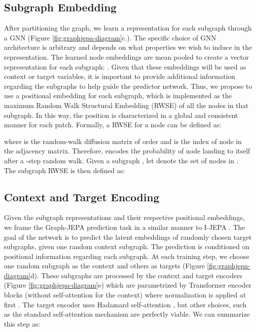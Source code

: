 \documentclass{article} \usepackage{iclr2024_conference,times}
\begin{document}
\subsection{Subgraph Embedding} \label{met:rwse}
After partitioning the graph, we learn a representation for each subgraph through a GNN (Figure \ref{fig:graphjepa-diagram}c.). The specific choice of GNN architecture is arbitrary and depends on what properties we wish to induce in the representation. The learned node embeddings are mean pooled to create a vector representation for each subgraph: . Given that these embeddings will be used as context or target variables, it is important to provide additional information regarding the subgraphs to help guide the predictor network. Thus, we propose to use a positional embedding for each subgraph, which is implemented as the maximum Random Walk Structural Embedding (RWSE) of all the nodes in that subgraph. In this way, the position is characterized in a global and consistent manner for each patch. Formally, a RWSE \citep{dwivedi2021graph} for a node  can be defined as:

where  is the random-walk diffusion matrix of order  and  is the index of node  in the adjacency matrix. Therefore,  encodes the probability of node  landing to itself after a -step random walk. Given a subgraph , let  denote the set of nodes in . The subgraph RWSE is then defined as:
 

\subsection{Context and Target Encoding} \label{met:context_target}
Given the subgraph representations and their respective positional embeddings, we frame the Graph-JEPA prediction task in a similar manner to I-JEPA \citep{assran2023self}. The goal of the network is to predict the latent embeddings of randomly chosen target subgraphs, given one random context subgraph. The prediction is conditioned on positional information regarding each subgraph. At each training step, we choose one random subgraph as the context  and  others as targets  (Figure \ref{fig:graphjepa-diagram}d). These subgraphs are processed by the context and target encoders (Figure \ref{fig:graphjepa-diagram}e) which are parametrized by Transformer encoder blocks (without self-attention for the context) where normalization is applied at first \citep{xiong2020layer}. The target encoder uses Hadamard self-attention \citep{he2023generalization}, but other choices, such as the standard self-attention mechanism \citep{vaswani2017attention} are perfectly viable. We can summarize this step as:
\end{document}
